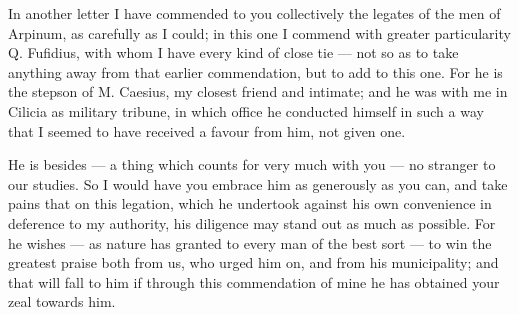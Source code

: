 

 In another letter I have commended to you collectively the legates of the men of Arpinum, as carefully as I could; in this one I commend with greater particularity Q. Fufidius, with whom I have every kind of close tie --- not so as to take anything away from that earlier commendation, but to add to this one. For he is the stepson of M. Caesius, my closest friend and intimate; and he was with me in Cilicia as military tribune, in which office he conducted himself in such a way that I seemed to have received a favour from him, not given one.

 He is besides --- a thing which counts for very much with you --- no stranger to our studies. So I would have you embrace him as generously as you can, and take pains that on this legation, which he undertook against his own convenience in deference to my authority, his diligence may stand out as much as possible. For he wishes --- as nature has granted to every man of the best sort --- to win the greatest praise both from us, who urged him on, and from his municipality; and that will fall to him if through this commendation of mine he has obtained your zeal towards him.
